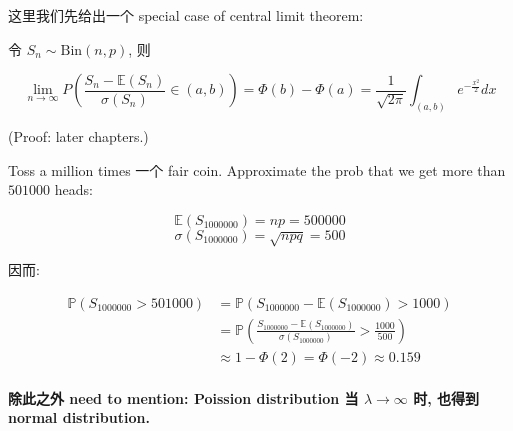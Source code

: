 这里我们先给出一个 special case of central limit theorem:

\begin{theorem}{}

令 \(\mathit{S}_{\mathit{n}} \sim \text{Bin}(\mathit{n},\mathit{p})\), 则

\[\lim\limits_{\mathit{n}\rightarrow\infty}\mathit{P}(\frac{\mathit{S}_{\mathit{n}} - \mathbb{E}(\mathit{S}_{\mathit{n}})}{\mathit{\sigma}(\mathit{S}_{\mathit{n}})} \in (\mathit{a},\mathit{b})) = \Phi(\mathit{b}) - \Phi(\mathit{a}) = \frac{1}{\sqrt{2\mathit{\pi}}}\int_{(\mathit{a},\mathit{b})}\mathit{e}^{- \frac{\mathit{x}^{2}}{2}}\mathit{d}\mathit{x}\]

\end{theorem}

(Proof: later chapters.)

\begin{example}

Toss a million times 一个 fair coin. Approximate the prob that we get more than \(501000\) heads:

\[\mathbb{E}(\mathit{S}_{1000000}) = \mathit{n}\mathit{p} = 500000\]\[\mathit{\sigma}(\mathit{S}_{1000000}) = \sqrt{\mathit{n}\mathit{p}\mathit{q}} = 500\]

因而:

\[\begin{matrix}
{\mathbb{P}(\mathit{S}_{1000000} > 501000)} & {= \mathbb{P}(\mathit{S}_{1000000} - \mathbb{E}(\mathit{S}_{1000000}) > 1000)} \\
 & {= \mathbb{P}\left( {\frac{\mathit{S}_{1000000} - \mathbb{E}(\mathit{S}_{1000000})}{\mathit{\sigma}(\mathit{S}_{1000000})} > \frac{1000}{500}} \right)} \\
 & {\approx 1 - \Phi(2) = \Phi( - 2) \approx 0.159}
\end{matrix}\]

\end{example}

\paragraph{\texorpdfstring{除此之外 need to mention: Poission distribution 当 \(\mathit{\lambda}\rightarrow\infty\) 时, 也得到 normal distribution.\\
}{除此之外 need to mention: Poission distribution 当 \textbackslash mathit\{\textbackslash lambda\}\textbackslash rightarrow\textbackslash infty 时, 也得到 normal distribution. }}\label{ux9664ux6b64ux4e4bux5916-need-to-mention-poission-distribution-ux5f53-mathitlambdarightarrowinfty-ux65f6-ux4e5fux5f97ux5230-normal-distribution.}

